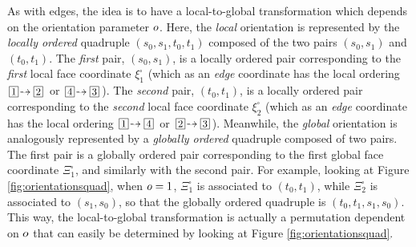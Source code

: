 As with edges, the idea is to have a local-to-global transformation which depends on the orientation parameter $o$.
Here, the \textit{local} orientation is represented by the \textit{locally ordered} quadruple $(s_0,s_1,t_0,t_1)$ composed of the two pairs $(s_0,s_1)$ and $(t_0,t_1)$.
The \textit{first} pair, $(s_0,s_1)$, is a locally ordered pair corresponding to the \textit{first} local face coordinate $\xi_1^\square$ (which as an \textit{edge} coordinate has the local ordering $\boxednum{1}\!\tdashto\boxednum{2}$ or $\boxednum{4}\!\tdashto\boxednum{3}$).
The \textit{second} pair, $(t_0,t_1)$, is a locally ordered pair corresponding to the \textit{second} local face coordinate $\xi_2^\square$ (which as an \textit{edge} coordinate has the local ordering $\boxednum{1}\!\tdashto\boxednum{4}$ or $\boxednum{2}\!\tdashto\boxednum{3}$).
Meanwhile, the \textit{global} orientation is analogously represented by a \textit{globally ordered} quadruple composed of two pairs.
The first pair is a globally ordered pair corresponding to the first global face coordinate $\Xi_1^\square$, and similarly with the second pair.
For example, looking at Figure \ref{fig:orientationsquad}, when $o=1$, $\Xi_1^\square$ is associated to $(t_0,t_1)$, while $\Xi_2^\square$ is associated to $(s_1,s_0)$, so that the globally ordered quadruple is $(t_0,t_1,s_1,s_0)$.
This way, the local-to-global transformation is actually a permutation dependent on $o$ that can easily be determined by looking at Figure \ref{fig:orientationsquad}.

